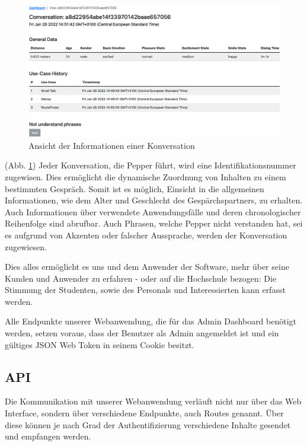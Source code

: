 \begin{figure}[H]
    \includegraphics[width=\textwidth]{Figures/NodeChapter/webappdetail.png}
    \caption{Ansicht der Informationen einer Konversation}
    \label{fig:webappdetail}
    \centering
\end{figure}

(Abb. \ref{fig:webappdetail}) Jeder Konversation, die Pepper führt, wird eine Identifikationsnummer zugewisen. Dies ermöglicht die dynamische Zuordnung von Inhalten zu einem bestimmten Gespräch. Somit ist es möglich, Einsicht in die allgemeinen Informationen, wie dem Alter und Geschlecht des Gespärchspartners, zu erhalten. Auch Informationen über verwendete Anwendungsfälle und deren chronologischer Reihenfolge sind abrufbar. Auch Phrasen, welche Pepper nicht verstanden hat, sei es aufgrund von Akzenten oder falscher Aussprache, werden der Konversation zugewiesen.

Dies alles ermöglicht es uns und dem Anwender der Software, mehr über seine Kunden und Anwender zu erfahren - oder auf die Hochschule bezogen: Die Stimmung der Studenten, sowie des Personals und Interessierten kann erfasst werden.

Alle Endpunkte unserer Webanwendung, die für das Admin Dashboard benötigt werden, setzen voraus, dass der Benutzer als Admin angemeldet ist und ein gültiges JSON Web Token in seinem Cookie besitzt.\\


\subsection{API}
\label{sec:nodechapter-api}
Die Kommunikation mit unserer Webanwendung verläuft nicht nur über das Web Interface, sondern über verschiedene Endpunkte, auch Routes genannt. Über diese können je nach Grad der Authentifizierung verschiedene Inhalte gesendet und empfangen werden.

